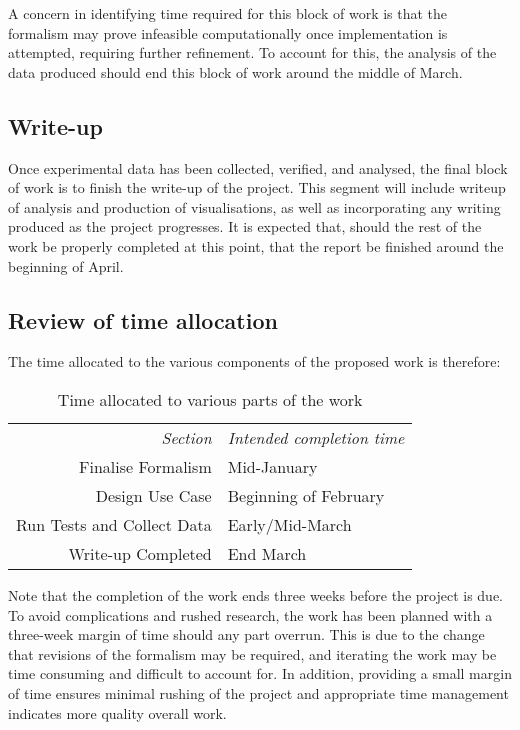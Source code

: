 A concern in identifying time required for this block of work is that the formalism may prove infeasible computationally once implementation is attempted, requiring further refinement. To account for this, the analysis of the data produced should end this block of work around the middle of March.\par

\subsection{Write-up}
Once experimental data has been collected, verified, and analysed, the final block of work is to finish the write-up of the project. This segment will include writeup of analysis and production of visualisations, as well as incorporating any writing produced as the project progresses. It is expected that, should the rest of the work be properly completed at this point, that the report be finished around the beginning of April.\par

\subsection{Review of time allocation}
The time allocated to the various components of the proposed work is therefore:%

\begin{table}[H]\label{table:time-allocation}
\begin{center}
\begin{tabular}{r|l}
    \emph{Section} & \emph{Intended completion time}\\
    Finalise Formalism & Mid-January\\
    Design Use Case & Beginning of February\\
    Run Tests and Collect Data & Early/Mid-March\\
    Write-up Completed & End March\\
\end{tabular}\par
    \caption{Time allocated to various parts of the work}
\end{center}
\end{table}

Note that the completion of the work ends three weeks before the project is due. To avoid complications and rushed research, the work has been planned with a three-week margin of time should any part overrun. This is due to the change that revisions of the formalism may be required, and iterating the work may be time consuming and difficult to account for. In addition, providing a small margin of time ensures minimal rushing of the project and appropriate time management indicates more quality overall work.\par
